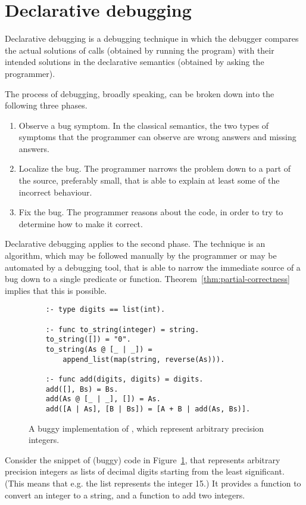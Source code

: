 \section{Declarative debugging}
\label{sec:decl-debug}

Declarative debugging is a debugging technique
in which the debugger compares the actual solutions of calls
(obtained by running the program)
with their intended solutions in the declarative semantics
(obtained by asking the programmer).

The process of debugging, broadly speaking,
can be broken down into the following three phases.
\begin{enumerate}
\item
Observe a bug symptom.
In the classical semantics,
the two types of symptoms that the programmer can observe
are wrong answers and missing answers.
\item
Localize the bug.
The programmer narrows the problem down to a part of the source,
preferably small,
that is able to explain at least some of the incorrect behaviour.
\item
Fix the bug.
The programmer reasons about the code,
in order to try to determine how to make it correct.
\end{enumerate}
Declarative debugging applies to the second phase.
The technique is an algorithm,
which may be followed manually by the programmer
or may be automated by a debugging tool,
that is able to narrow the immediate source of a bug
down to a single predicate or function.
Theorem~\ref{thm:partial-correctness} implies that this is possible.

\begin{figure}[htb]
\begin{verbatim}
    :- type digits == list(int).

    :- func to_string(integer) = string.
    to_string([]) = "0".
    to_string(As @ [_ | _]) =
        append_list(map(string, reverse(As))).

    :- func add(digits, digits) = digits.
    add([], Bs) = Bs.
    add(As @ [_ | _], []) = As.
    add([A | As], [B | Bs]) = [A + B | add(As, Bs)].
\end{verbatim}
\caption{
A buggy implementation of ,
which represent arbitrary precision integers.
\label{fig:buggy-ints}}
\end{figure}

Consider the snippet of (buggy) code in Figure~\ref{fig:buggy-ints},
that represents arbitrary precision integers
as lists of decimal digits
starting from the least significant.
(This means that e.g.\: the list \co{[5,1]} represents the integer 15.)
It provides a function
to convert an integer to a string,
and a function to add two integers.

